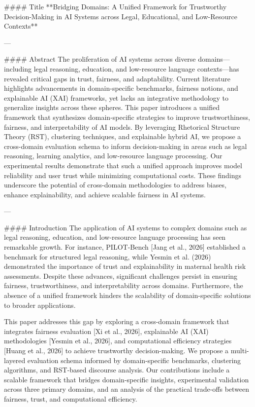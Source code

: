 #### Title  
**Bridging Domains: A Unified Framework for Trustworthy Decision-Making in AI Systems across Legal, Educational, and Low-Resource Contexts**

---

#### Abstract  
The proliferation of AI systems across diverse domains—including legal reasoning, education, and low-resource language contexts—has revealed critical gaps in trust, fairness, and adaptability. Current literature highlights advancements in domain-specific benchmarks, fairness notions, and explainable AI (XAI) frameworks, yet lacks an integrative methodology to generalize insights across these spheres. This paper introduces a unified framework that synthesizes domain-specific strategies to improve trustworthiness, fairness, and interpretability of AI models. By leveraging Rhetorical Structure Theory (RST), clustering techniques, and explainable hybrid AI, we propose a cross-domain evaluation schema to inform decision-making in areas such as legal reasoning, learning analytics, and low-resource language processing. Our experimental results demonstrate that such a unified approach improves model reliability and user trust while minimizing computational costs. These findings underscore the potential of cross-domain methodologies to address biases, enhance explainability, and achieve scalable fairness in AI systems.

---

#### Introduction  
The application of AI systems to complex domains such as legal reasoning, education, and low-resource language processing has seen remarkable growth. For instance, PILOT-Bench [Jang et al., 2026] established a benchmark for structured legal reasoning, while Yesmin et al. (2026) demonstrated the importance of trust and explainability in maternal health risk assessments. Despite these advances, significant challenges persist in ensuring fairness, trustworthiness, and interpretability across domains. Furthermore, the absence of a unified framework hinders the scalability of domain-specific solutions to broader applications.  

This paper addresses this gap by exploring a cross-domain framework that integrates fairness evaluation [Xi et al., 2026], explainable AI (XAI) methodologies [Yesmin et al., 2026], and computational efficiency strategies [Huang et al., 2026] to achieve trustworthy decision-making. We propose a multi-layered evaluation schema informed by domain-specific benchmarks, clustering algorithms, and RST-based discourse analysis. Our contributions include a scalable framework that bridges domain-specific insights, experimental validation across three primary domains, and an analysis of the practical trade-offs between fairness, trust, and computational efficiency.

